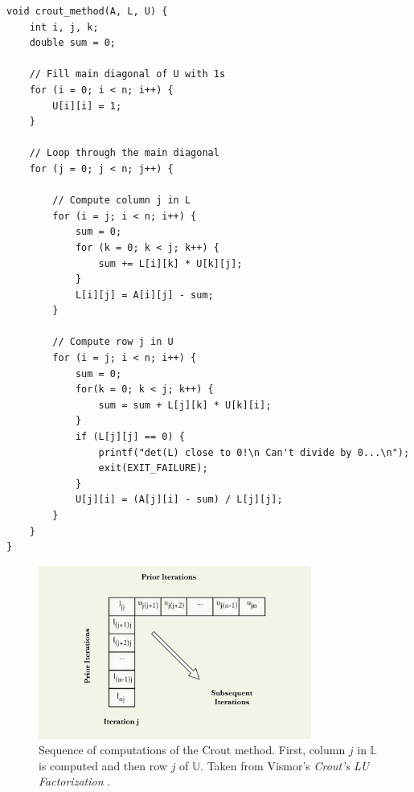 \begin{lstlisting}[caption={C++ Pseudo-code implementing Crout's matrix decomposition algorithm. It assumes that \code{A[n][n]} is a two-dimensional array that represents the invertible square coefficient matrix $ \mathbb{A} $; \code{L[n][n]} and \code{U[n][n]} are also two-dimensional arrays reprenting matrices $ \mathbb{L} $ and $ \mathbb{U} $ respectively. Furthermore, it is assumed that \code{L} and \code{U} are populated with zeros. Derived from \emph{Crout's LU Factorization} \cite{rqjYYJkSwERYYbSy}, \emph{Numerical recipes: the art of scientific computing} \cite{Press2007} and \emph{Crout matrix decomposition} \cite{TgtpOw7zCHo3ii0m}.},label={Listing:LU-decomposition-crout-method-pseudocode}]
void crout_method(A, L, U) {
	int i, j, k;
	double sum = 0;
	
	// Fill main diagonal of U with 1s
	for (i = 0; i < n; i++) {
		U[i][i] = 1;
	}
	
	// Loop through the main diagonal
	for (j = 0; j < n; j++) {
		
		// Compute column j in L
		for (i = j; i < n; i++) {
			sum = 0;
			for (k = 0; k < j; k++) {
				sum += L[i][k] * U[k][j];	
			}
			L[i][j] = A[i][j] - sum;
		}
		
		// Compute row j in U
		for (i = j; i < n; i++) {
			sum = 0;
			for(k = 0; k < j; k++) {
				sum = sum + L[j][k] * U[k][i];
			}
			if (L[j][j] == 0) {
				printf("det(L) close to 0!\n Can't divide by 0...\n");
				exit(EXIT_FAILURE);
			}
			U[j][i] = (A[j][i] - sum) / L[j][j];
		}
	}
}
\end{lstlisting}

\begin{figure}[h!]
	\centering
	\includegraphics[width=0.8\textwidth, keepaspectratio]{images/ch1/LU_decomposition_crout_method_visualization.png}
	\caption{Sequence of computations of the Crout method. First, column $ j $ in $ \mathbb{L} $ is computed and then row $ j $ of $ \mathbb{U} $. Taken from Vismor's \emph{Crout's LU Factorization} \cite{rqjYYJkSwERYYbSy}.}
	\label{Figure:LU-decomposition-crout-method-visualisation}
\end{figure}

